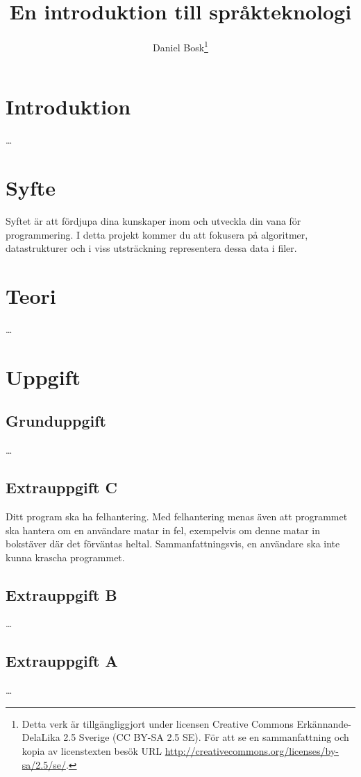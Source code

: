 \documentclass[a4paper]{miunasgn}
\title{En introduktion till språkteknologi}
\author{Daniel Bosk\footnote{%
	Detta verk är tillgängliggjort under licensen Creative Commons 
	Erkännande-DelaLika 2.5 Sverige (CC BY-SA 2.5 SE).
	För att se en sammanfattning och kopia av licenstexten besök URL 
	\url{http://creativecommons.org/licenses/by-sa/2.5/se/}.
}}
\date{\svnId}
\theoremstyle{definition}
\begin{document}
\maketitle
\thispagestyle{foot}
\tableofcontents


\section{Introduktion}
\noindent
\dots


\section{Syfte}
\noindent
Syftet är att fördjupa dina kunskaper inom och utveckla din vana för 
programmering.
I detta projekt kommer du att fokusera på algoritmer, datastrukturer och i viss 
utsträckning representera dessa data i filer.


\section{Teori}
\label{sec:Theory}
\noindent
\dots


\section{Uppgift}
\label{sec:Tasks}
\noindent


\subsection{Grunduppgift}
\noindent
\dots

\subsection{Extrauppgift C}
\noindent
Ditt program ska ha felhantering.
Med felhantering menas även att programmet ska hantera om en användare matar in 
fel, exempelvis om denne matar in bokstäver där det förväntas heltal.
Sammanfattningsvis, en användare ska inte kunna krascha programmet.

\subsection{Extrauppgift B}
\noindent
\dots

\subsection{Extrauppgift A}
\noindent
\dots






\end{document}
